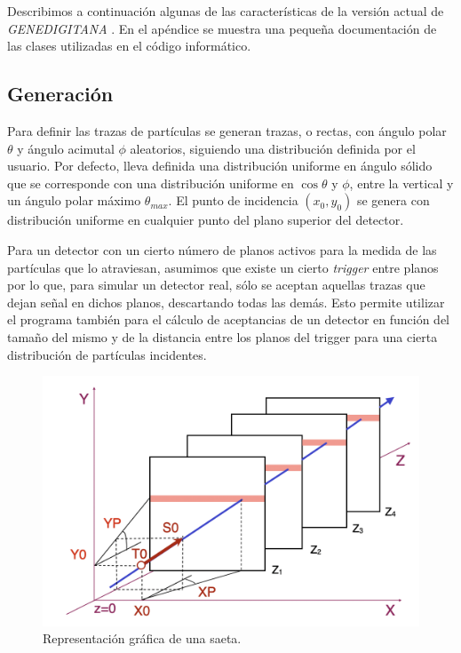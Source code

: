 \documentclass[a4paper]{article}
\begin{document}
Describimos a continuación algunas de las características de la versión actual de  \textit{GENEDIGITANA} . En el apéndice se muestra una pequeña documentación de las clases utilizadas en el código informático.

\subsection{Generación}

Para definir las trazas de partículas se generan trazas, o rectas, con ángulo polar $\theta$ y ángulo acimutal $ \phi$ aleatorios, siguiendo una distribución definida por el usuario. Por defecto, lleva definida una distribución uniforme en ángulo sólido que se corresponde con una distribución uniforme en $\cos \theta$ y $\phi$, entre la vertical y un ángulo polar máximo $\theta_{max}$.
El punto de incidencia $(x_0, y_0)$  se genera con distribución uniforme en cualquier punto del plano superior del detector.

Para un detector con un cierto número de planos activos para la medida de las partículas que lo atraviesan, asumimos que  existe un cierto \textit{trigger} entre planos por lo que, para simular un detector real, sólo se aceptan aquellas trazas que dejan señal en dichos planos, descartando todas las demás. Esto permite utilizar el programa también para el cálculo de aceptancias de un detector en función del tamaño del mismo y de la distancia entre los planos del trigger para una cierta distribución de partículas incidentes.

\begin{figure}[h] 
  \centering
  \includegraphics[width=0.7\linewidth]{saeta_3d.png} 
  \caption{Representación gráfica de una saeta.}
  \label{fg:saeta} 
\end{figure}
\end{document}
